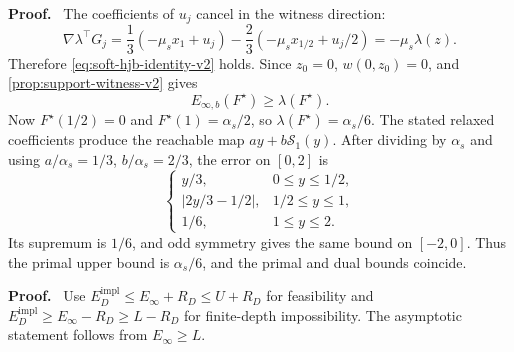 \documentclass[twoside,11pt]{article}
\renewenvironment{proof}[1][Proof]{\par\noindent\textbf{#1.}\ }{\hfill\BlackBox\par\medskip}
\newcommand{\soft}{\mathcal{S}}
\newcommand{\abs}[1]{\left\lvert #1\right\rvert}
\begin{document}
\begin{proof}
The coefficients of $u_j$ cancel in the witness direction:
\[
 \nabla\lambda^\top G_j
 =\frac13(-\mu_sx_1+u_j)
  -\frac23(-\mu_sx_{1/2}+u_j/2)
 =-\mu_s\lambda(z).
\]
Therefore \eqref{eq:soft-hjb-identity-v2} holds.  Since $z_0=0$,
$w(0,z_0)=0$, and \cref{prop:support-witness-v2} gives
\[
 E_{\infty,b}(F^\star)\ge\lambda(F^\star).
\]
Now $F^\star(1/2)=0$ and $F^\star(1)=\alpha_s/2$, so
$\lambda(F^\star)=\alpha_s/6$.  The stated relaxed coefficients produce the reachable map
$a y+b\soft_1(y)$.  After dividing by $\alpha_s$ and using
$a/\alpha_s=1/3$, $b/\alpha_s=2/3$, the error on $[0,2]$ is
\[
 \begin{cases}
  y/3,&0\le y\le1/2,\\
  \abs{2y/3-1/2},&1/2\le y\le1,\\
  1/6,&1\le y\le2.
 \end{cases}
\]
Its supremum is $1/6$, and odd symmetry gives the same bound on $[-2,0]$.
Thus the primal upper bound is $\alpha_s/6$, and the primal and dual bounds
coincide.
\end{proof}


\begin{proof}
Use
$E_D^{\mathrm{impl}}\le E_\infty+R_D\le U+R_D$ for feasibility and
$E_D^{\mathrm{impl}}\ge E_\infty-R_D\ge L-R_D$ for finite-depth
impossibility.  The asymptotic statement follows from $E_\infty\ge L$.
\end{proof}
\end{document}
